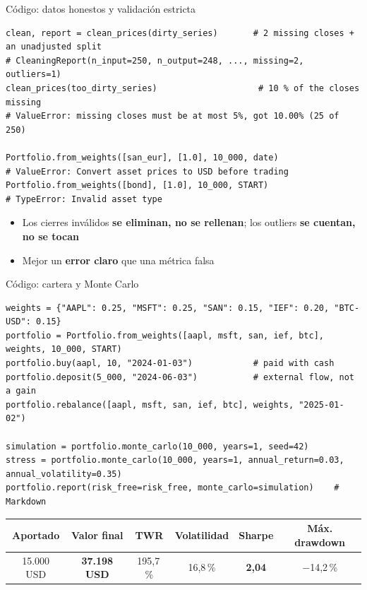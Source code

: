 \documentclass[aspectratio=169,10pt]{beamer}
\begin{document}
\begin{frame}[fragile]{Código: datos honestos y validación estricta}
\begin{lstlisting}
clean, report = clean_prices(dirty_series)       # 2 missing closes + an unadjusted split
# CleaningReport(n_input=250, n_output=248, ..., missing=2, outliers=1)
clean_prices(too_dirty_series)                    # 10 % of the closes missing
# ValueError: missing closes must be at most 5%, got 10.00% (25 of 250)

Portfolio.from_weights([san_eur], [1.0], 10_000, date)
# ValueError: Convert asset prices to USD before trading
Portfolio.from_weights([bond], [1.0], 10_000, START)
# TypeError: Invalid asset type
\end{lstlisting}
  \vspace{0.5em}
  \small
  \begin{itemize}
    \item Los cierres inválidos \textbf{se eliminan, no se rellenan}; los outliers \textbf{se cuentan, no se tocan}
    \item Mejor un \textbf{error claro} que una métrica falsa
  \end{itemize}
\end{frame}

\begin{frame}[fragile]{Código: cartera y Monte Carlo}
\begin{lstlisting}
weights = {"AAPL": 0.25, "MSFT": 0.25, "SAN": 0.15, "IEF": 0.20, "BTC-USD": 0.15}
portfolio = Portfolio.from_weights([aapl, msft, san, ief, btc], weights, 10_000, START)
portfolio.buy(aapl, 10, "2024-01-03")            # paid with cash
portfolio.deposit(5_000, "2024-06-03")           # external flow, not a gain
portfolio.rebalance([aapl, msft, san, ief, btc], weights, "2025-01-02")

simulation = portfolio.monte_carlo(10_000, years=1, seed=42)
stress = portfolio.monte_carlo(10_000, years=1, annual_return=0.03, annual_volatility=0.35)
portfolio.report(risk_free=risk_free, monte_carlo=simulation)    # Markdown
\end{lstlisting}
  \vspace{0.6em}
  \centering
  \footnotesize
  \begin{tabular}{@{}cccccc@{}}
    \toprule
    Aportado & Valor final & TWR & Volatilidad & Sharpe & Máx. drawdown \\
    \midrule
    15.000 USD & \textbf{37.198 USD} & 195,7\,\% & 16,8\,\% & \textbf{2,04} & $-$14,2\,\% \\
    \bottomrule
  \end{tabular}
\end{frame}
\end{document}
